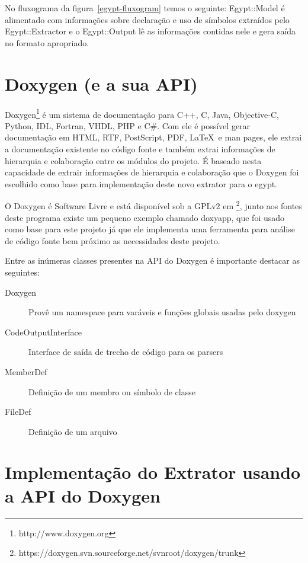 No fluxograma da figura~\ref{egypt-fluxogram} temos o seguinte: Egypt::Model é
alimentado com informações sobre declaração e uso de símbolos extraídos pelo
Egypt::Extractor e o Egypt::Output lê as informações contidas nele e gera saída
no formato apropriado.

\section{Doxygen (e a sua API)}

Doxygen\footnote{http://www.doxygen.org} é um sistema de documentação para C++,
C, Java, Objective-C, Python, IDL, Fortran, VHDL, PHP e C\#. Com ele é possível
gerar documentação em HTML, RTF, PostScript, PDF, \LaTeX\ e man pages, ele
extrai a documentação existente no código fonte e também extrai informações de
hierarquia e colaboração entre os módulos do projeto. É baseado nesta
capacidade de extrair informações de hierarquia e colaboração que o Doxygen foi
escolhido como base para implementação deste novo extrator para o egypt.

O Doxygen é Software Livre e está disponível sob a GPLv2 em
\footnote{https://doxygen.svn.sourceforge.net/svnroot/doxygen/trunk}, junto aos
fontes deste programa existe um pequeno exemplo chamado doxyapp, que foi usado
como base para este projeto já que ele implementa uma ferramenta para análise
de código fonte bem próximo as necessidades deste projeto.

Entre as inúmeras classes presentes na API do Doxygen é importante
destacar as seguintes:

\begin{description}
\item[Doxygen] Provê um namespace para varáveis e funções globais usadas pelo doxygen
\item[CodeOutputInterface] Interface de saída de trecho de código para os parsers
\item[MemberDef] Definição de um membro ou símbolo de classe
\item[FileDef] Definição de um arquivo
\end{description}

\section{Implementação do Extrator usando a API do Doxygen}

